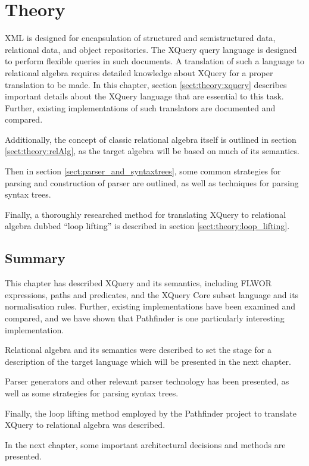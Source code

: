 \chapter{Theory}
\label{chapter:theory}
XML is designed for encapsulation of structured and semistructured data,
relational data, and object repositories. The XQuery query language is designed
to perform flexible queries in such documents. A translation of such a
language to relational algebra requires detailed knowledge about XQuery for a
proper translation to be made. In this chapter, section
\ref{sect:theory:xquery} describes important details about the XQuery
language that are essential to this task. Further, existing implementations of
such translators are documented and compared.

Additionally, the concept of classic relational algebra itself is outlined in
section \ref{sect:theory:relAlg}, as the target algebra will be based on much
of its semantics.

Then in section \ref{sect:parser_and_syntaxtrees}, some common strategies for
parsing and construction of parser are outlined, as well as techniques for
parsing syntax trees.

Finally, a thoroughly researched method for translating XQuery to relational
algebra dubbed ``loop lifting'' is described in section
\ref{sect:theory:loop_lifting}.







\section{Summary}
\label{sect:theory:summary}
This chapter has described XQuery and its semantics, including FLWOR
expressions, paths and predicates, and the XQuery Core subset language and its
normalisation rules. Further, existing implementations have been examined and
compared, and we have shown that Pathfinder is one particularly interesting
implementation.

Relational algebra and its semantics were described to set the stage for a
description of the target language which will be presented in the next chapter.

Parser generators and other relevant parser technology has been presented, as
well as some strategies for parsing syntax trees.

Finally, the loop lifting method employed by the Pathfinder project to
translate XQuery to relational algebra was described.

In the next chapter, some important architectural decisions and methods are
presented.